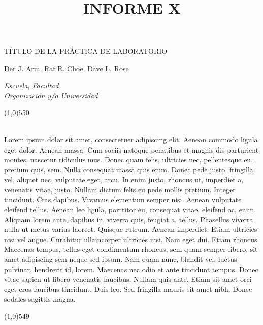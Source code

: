 \documentclass[a4paper,12pt]{article}
\title{INFORME X}
\renewenvironment{abstract}%
 {\par\noindent\textbf{\abstractname}\ \ignorespaces \\}
 {\par\noindent\medskip}
\begin{document}
\begin{center}
\Large{TÍTULO DE LA PRÁCTICA DE LABORATORIO}
\vspace{0.4cm}

\normalsize
Der J. Arm, Raf R. Choe, Dave L. Rose
\vspace{0.1cm}

\textit{\small{Escuela, Facultad }\\
\small{Organización y/o Universidad}}
\medskip

\normalsize

\end{center}
\line(1,0){550}
\begin{abstract}
Lorem ipsum dolor sit amet, consectetuer adipiscing elit. Aenean commodo ligula eget dolor. Aenean massa. Cum sociis natoque penatibus et magnis dis parturient montes, nascetur ridiculus mus. Donec quam felis, ultricies nec, pellentesque eu, pretium quis, sem. Nulla consequat massa quis enim. Donec pede justo, fringilla vel, aliquet nec, vulputate eget, arcu. In enim justo, rhoncus ut, imperdiet a, venenatis vitae, justo. Nullam dictum felis eu pede mollis pretium. Integer tincidunt. Cras dapibus. Vivamus elementum semper nisi. Aenean vulputate eleifend tellus. Aenean leo ligula, porttitor eu, consequat vitae, eleifend ac, enim. Aliquam lorem ante, dapibus in, viverra quis, feugiat a, tellus. Phasellus viverra nulla ut metus varius laoreet. Quisque rutrum. Aenean imperdiet. Etiam ultricies nisi vel augue. Curabitur ullamcorper ultricies nisi. Nam eget dui. Etiam rhoncus. Maecenas tempus, tellus eget condimentum rhoncus, sem quam semper libero, sit amet adipiscing sem neque sed ipsum. Nam quam nunc, blandit vel, luctus pulvinar, hendrerit id, lorem. Maecenas nec odio et ante tincidunt tempus. Donec vitae sapien ut libero venenatis faucibus. Nullam quis ante. Etiam sit amet orci eget eros faucibus tincidunt. Duis leo. Sed fringilla mauris sit amet nibh. Donec sodales sagittis magna.
\end{abstract}
\line(1,0){549}
\medskip
\end{document}

